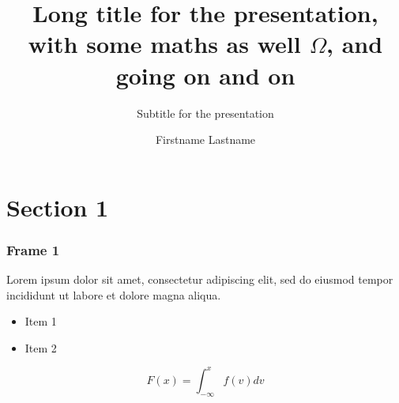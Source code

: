 \documentclass[]{beamer}
\title[Short title]{Long title for the presentation, with some maths as well $\Omega$, and going on and on}
\subtitle{Subtitle for the presentation}
\author{Firstname Lastname}
\date{}
\begin{document}
\begin{frame}
\titlepage
\end{frame}




\section{Section 1}


\begin{frame}
\frametitle{Frame 1}

Lorem ipsum dolor sit amet, consectetur adipiscing elit, sed do eiusmod tempor incididunt ut labore et dolore magna aliqua. 

\begin{itemize}
	\item Item 1
	\item Item 2
\end{itemize}

\[F(x) = \int_{-\infty}^x f(v)dv \]

\end{frame}
\end{document}
